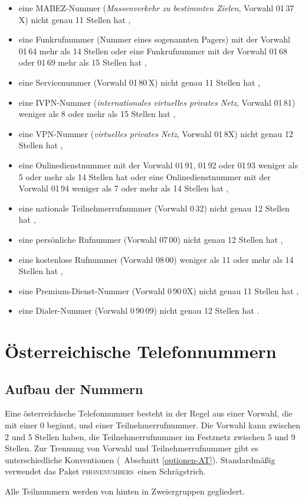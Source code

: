 \documentclass[numbers=noenddot]{scrreprt}
\newcommand*{\Paket}[1]{\textsc{#1}}
\newcommand{\phone}{\textcolor{cnltx}{\Paket{phone\-numbers}}}
\newcommand{\UeberschriftAufbau}{\section{Aufbau der Nummern}}
\newcommand*{\vglAbschnitt}[1]{(\cf\ Abschnitt \ref{#1})}
\newcommand*{\AufbauDEATA}[6]{Eine #1 Telefonnummer besteht in der Regel aus einer Vorwahl, die mit einer 0 beginnt, und einer Teilnehmerrufnummer. Die Vorwahl kann zwischen #2 und #3 Stellen haben, die Teilnehmerrufnummer im Festznetz zwischen #4 und #5 Stellen. Zur Trennung von Vorwahl und Teilnehmerrufnummer gibt es unterschiedliche Konventionen
\vglAbschnitt{#6}.
Standardmäßig verwendet das Paket \phone\ einen Schrägstrich.}
\begin{document}
\begin{itemize}
\item eine MABEZ-Nummer (\emph{Massenverkehr zu bestimmten Zielen}, Vorwahl 01\,37\,X) nicht genau 11 Stellen hat \cite[2]{BNA-mabez},
\item eine Funkrufnummer (Nummer eines sogenannten Pagers) mit der Vorwahl 01\,64 mehr als 14 Stellen oder eine Funkrufnummer mit der Vorwahl 01\,68 oder 01\,69 mehr als 15 Stellen hat \cite[2]{BNA-nummernplan},
\item eine Servicenummer (Vorwahl 01\,80\,X) nicht genau 11 Stellen hat \cite[71]{BNA-konzept},
\item eine IVPN-Nummer (\emph{internationales virtuelles privates Netz}, Vorwahl 01\,81) weniger als 8 oder mehr als 15 Stellen hat \cite[55]{BNA-konzept},
\item eine VPN-Nummer (\emph{virtuelles privates Netz}, Vorwahl 01\,8X) nicht genau 12 Stellen hat \cite[53]{BNA-konzept},
\item eine Onlinedienstnummer mit der Vorwahl 01\,91, 01\,92 oder 01\,93 weniger als 5 oder mehr als 14 Stellen hat oder eine Onlinedienstnummer mit der Vorwahl 01\,94 weniger als 7 oder mehr als 14 Stellen hat \cite[\ppno\ 1 u. 4]{BNA-019},
\item eine nationale Teilnehmerrufnummer (Vorwahl 0\,32) nicht genau 12 Stellen hat \cite[45]{BNA-konzept},
\item eine persönliche Rufnummer (Vorwahl 07\,00) nicht genau 12 Stellen hat \cite[74]{BNA-konzept},
\item eine kostenlose Rufnummer (Vorwahl 08\,00) weniger als 11 oder mehr als 14 Stellen hat \cite[\ppno\ 1 u. 5\psq]{BNA-0800},
\item eine Premium-Dienst-Nummer (Vorwahl 0\,90\,0X) nicht genau 11 Stellen hat \cite[76]{BNA-konzept},
\item eine Dialer-Nummer (Vorwahl 0\,90\,09) nicht genau 12 Stellen hat \cite[78]{BNA-konzept}.
\end{itemize}

\chapter{Österreichische Telefonnummern}
\UeberschriftAufbau
\AufbauDEATA{österreichische}{2}{5}{5}{9}{optionen-AT}

Alle Teilnummern werden von hinten in Zweiergruppen gegliedert.
\begin{sidebyside}
\end{sidebyside}
\end{document}
